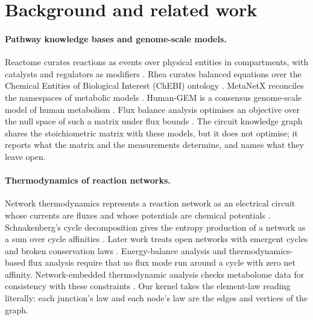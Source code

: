 \section{Background and related work}
\label{sec:related}

\paragraph{Pathway knowledge bases and genome-scale models.}
Reactome curates reactions as events over physical entities in compartments, with catalysts and regulators as modifiers \citep{gillespie2022reactome}.
Rhea curates balanced equations over the Chemical Entities of Biological Interest (ChEBI) ontology \citep{bansal2022rhea,hastings2016chebi}.
MetaNetX reconciles the namespaces of metabolic models \citep{moretti2021metanetx}.
Human-GEM is a consensus genome-scale model of human metabolism \citep{robinson2020humangem}.
Flux balance analysis optimises an objective over the null space of such a matrix under flux bounds \citep{orth2010fba}.
The circuit knowledge graph shares the stoichiometric matrix with these models, but it does not optimise; it reports what the matrix and the measurements determine, and names what they leave open.

\paragraph{Thermodynamics of reaction networks.}
Network thermodynamics represents a reaction network as an electrical circuit whose currents are fluxes and whose potentials are chemical potentials \citep{oster1971network}.
Schnakenberg's cycle decomposition gives the entropy production of a network as a sum over cycle affinities \citep{schnakenberg1976network}.
Later work treats open networks with emergent cycles and broken conservation laws \citep{polettini2014irreversible,rao2016nonequilibrium}.
Energy-balance analysis \citep{beard2002energy} and thermodynamics-based flux analysis \citep{henry2007tfba} require that no flux mode run around a cycle with zero net affinity.
Network-embedded thermodynamic analysis checks metabolome data for consistency with these constraints \citep{kummel2006net}.
Our kernel takes the element-law reading literally: each junction's law and each node's law are the edges and vertices of the graph.

